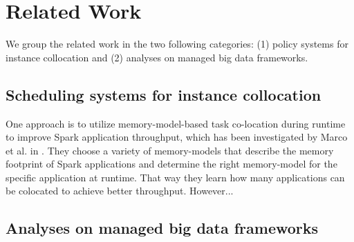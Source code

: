 \section{Related Work}

We group the related work in the two following categories:
%
(1) policy systems for instance collocation and
%
(2) analyses on managed big data frameworks.


\subsection{Scheduling systems for instance collocation}
One approach is to utilize memory-model-based task co-location during
runtime to improve Spark application throughput, which has been
investigated by Marco et al. in \cite{Colocation}. They choose a
variety of memory-models that describe the memory footprint of Spark
applications and determine the right memory-model for the specific
application at runtime. That way they learn how many applications can
be colocated to achieve better throughput. However... 

\subsection{Analyses on managed big data frameworks}

